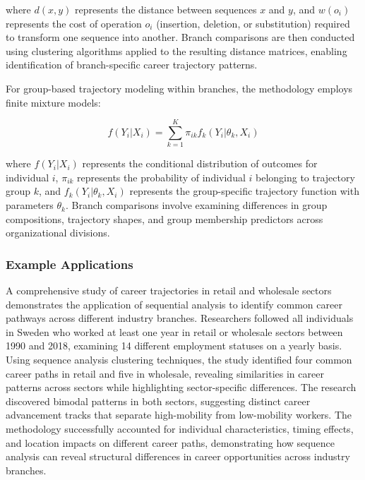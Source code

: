 \documentclass[main.tex]{subfiles}
\begin{document}
where \(d(x,y)\) represents the distance between sequences \(x\) and \(y\), and \(w(o_i)\) represents the cost of operation \(o_i\) (insertion, deletion, or substitution) required to transform one sequence into another\parencite{ECB2021, Jones2001}. Branch comparisons are then conducted using clustering algorithms applied to the resulting distance matrices, enabling identification of branch-specific career trajectory patterns.

For group-based trajectory modeling within branches, the methodology employs finite mixture models:

\[
f(Y_i|X_i) = \sum_{k=1}^{K} \pi_{ik} f_k(Y_i|\theta_k, X_i)
\]

where \(f(Y_i|X_i)\) represents the conditional distribution of outcomes for individual \(i\), \(\pi_{ik}\) represents the probability of individual \(i\) belonging to trajectory group \(k\), and \(f_k(Y_i|\theta_k, X_i)\) represents the group-specific trajectory function with parameters \(\theta_k\)\parencite{MOOCGBTM, Jones2001}. Branch comparisons involve examining differences in group compositions, trajectory shapes, and group membership predictors across organizational divisions.

\subsubsection{Example Applications}


A comprehensive study of career trajectories in retail and wholesale sectors demonstrates the application of sequential analysis to identify common career pathways across different industry branches\parencite{ECB2021}. Researchers followed all individuals in Sweden who worked at least one year in retail or wholesale sectors between 1990 and 2018, examining 14 different employment statuses on a yearly basis. Using sequence analysis clustering techniques, the study identified four common career paths in retail and five in wholesale, revealing similarities in career patterns across sectors while highlighting sector-specific differences. The research discovered bimodal patterns in both sectors, suggesting distinct career advancement tracks that separate high-mobility from low-mobility workers. The methodology successfully accounted for individual characteristics, timing effects, and location impacts on different career paths, demonstrating how sequence analysis can reveal structural differences in career opportunities across industry branches.
\end{document}
